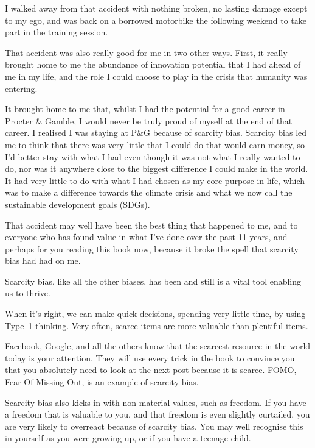 \begin{longstoryblock}
I walked away from that accident with nothing broken, no lasting damage except to my ego, and was back on a borrowed motorbike the following weekend to take part in the training session.


That accident was also really good for me in two other ways. First, it really brought home to me the abundance of innovation potential that I had ahead of me in my life, and the role I could choose to play in the crisis that humanity was entering. 


It brought home to me that, whilst I had the potential for a good career in Procter \& Gamble, I would never be truly proud of myself at the end of that career. I realised I was staying at P\&G because of scarcity bias.  Scarcity bias led me to think that there was very little that I could do that would earn money, so I'd better stay with what I had even though it was not what I really wanted to do, nor was it anywhere close to the biggest difference I could make in the world. It had very little to do with what I had chosen as my core purpose in life, which was to make a difference towards the climate crisis and what we now call the sustainable development goals (SDGs).


That accident may well have been the best thing that happened to me, and to everyone who has found value in what I've done over the past 11 years, and perhaps for you reading this book now, because it broke the spell that scarcity bias had had on me.
\end{longstoryblock}


Scarcity bias, like all the other biases, has been and still is a vital tool enabling us to thrive. 


When it's right, we can make quick decisions, spending very little time, by using Type~1 thinking. Very often, scarce items are more valuable than plentiful items. 


Facebook, Google,  and all the others know that the scarcest resource in the world today is your attention.  They will use every trick in the book to convince you that you absolutely need to look at the next post because it is scarce. FOMO, Fear Of Missing Out, is an example of scarcity bias.


Scarcity bias also kicks in with non-material values, such as freedom.  If you have a freedom that is valuable to you, and that freedom is even slightly curtailed, you are very likely to overreact because of scarcity bias. You may well recognise this in yourself as you were growing up, or if you have a teenage child. 


